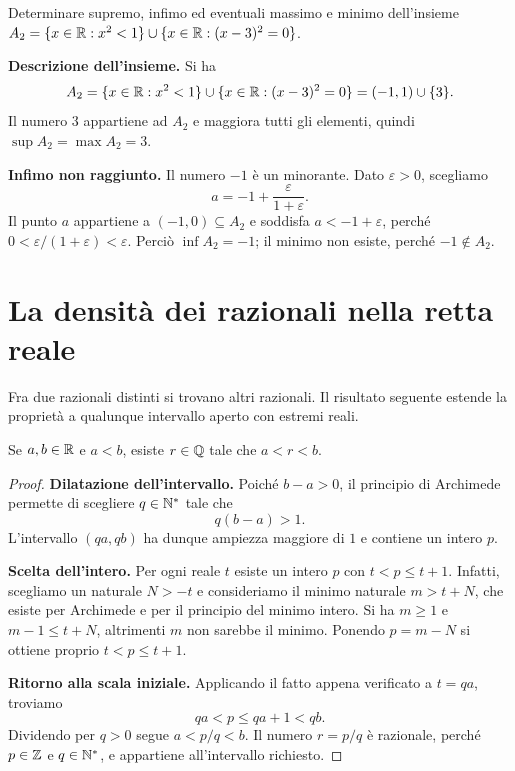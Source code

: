 \begin{esercizio}
Determinare supremo, infimo ed eventuali massimo e minimo dell'insieme $A_2=\{x\in\mathbb{R}:x^2<1\}\cup\{x\in\mathbb{R}:(x-3)^2=0\}$.
\end{esercizio}
\begin{svolgimento}
\textbf{Descrizione dell'insieme.} Si ha
\[
  A_2=\{x\in\mathbb{R}:x^2<1\}
      \cup\{x\in\mathbb{R}:(x-3)^2=0\}
     =(-1,1)\cup\{3\}.
\]
Il numero $3$ appartiene ad $A_2$ e maggiora tutti gli elementi, quindi $\sup A_2=\max A_2=3$.

\textbf{Infimo non raggiunto.} Il numero $-1$ è un minorante. Dato $\varepsilon>0$, scegliamo
\[
  a=-1+\frac{\varepsilon}{1+\varepsilon}.
\]
Il punto $a$ appartiene a $(-1,0)\subseteq A_2$ e soddisfa $a<-1+\varepsilon$, perché $0<\varepsilon/(1+\varepsilon)<\varepsilon$. Perciò $\inf A_2=-1$; il minimo non esiste, perché $-1\notin A_2$.
\end{svolgimento}

\section{La densità dei razionali nella retta reale}

Fra due razionali distinti si trovano altri razionali. Il risultato seguente estende la proprietà a qualunque intervallo aperto con estremi reali.

\begin{teorema}[Densità di $\Q$ in $\R$]
\label{teo:densita-razionali}
Se $a,b\in\mathbb{R}$ e $a<b$, esiste $r\in\mathbb{Q}$ tale che $a<r<b$.
\end{teorema}
\begin{proof}
\textbf{Dilatazione dell’intervallo.} Poiché $b-a>0$, il principio di Archimede permette di scegliere $q\in\mathbb{N}^*$ tale che
\[
  q(b-a)>1.
\]
L'intervallo $(qa,qb)$ ha dunque ampiezza maggiore di $1$ e contiene un intero $p$.

\textbf{Scelta dell’intero.} Per ogni reale $t$ esiste un intero $p$ con $t<p\le t+1$. Infatti, scegliamo un naturale $N>-t$ e consideriamo il minimo naturale $m>t+N$, che esiste per Archimede e per il principio del minimo intero. Si ha $m\ge1$ e $m-1\le t+N$, altrimenti $m$ non sarebbe il minimo. Ponendo $p=m-N$ si ottiene proprio $t<p\le t+1$.

\textbf{Ritorno alla scala iniziale.} Applicando il fatto appena verificato a $t=qa$, troviamo
\[
  qa<p\le qa+1<qb.
\]
Dividendo per $q>0$ segue $a<p/q<b$. Il numero $r=p/q$ è razionale, perché $p\in\mathbb{Z}$ e $q\in\mathbb{N}^*$, e appartiene all'intervallo richiesto.
\end{proof}

